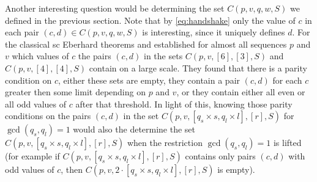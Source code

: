 Another interesting question would be determining the set $C(p, v, q, w, S)$ we defined in the previous section. Note that by \eqref{eq:handshake} only the value of $c$ in each pair $(c, d) \in C(p, v, q, w, S)$ is interesting, since it uniquely defines $d$. For the classical {sc Eberhard} theorems \cite{jendrol1993face} and \cite{jucovivc1976face} established for almost all sequences $p$ and $v$ which values of $c$ the pairs $(c, d)$ in the sets $C(p, v, [6], [3], S)$ and $C(p, v, [4], [4], S)$ contain on a large scale. They found that there is a parity condition on $c$, either these sets are empty, they contain a pair $(c, d)$ for each $c$ greater then some limit depending on $p$ and $v$, or they contain either all even or all odd values of $c$ after that threshold. In light of this, knowing those parity conditions on the pairs $(c, d)$ in the set $C(p, v, [q_s \times s, q_l \times l], [r], S)$ for $\gcd(q_s, q_l) = 1$ would also the determine the set $C(p, v, [q_s \times s, q_l \times l], [r], S)$ when the restriction $\gcd(q_s, q_l) = 1$ is lifted (for example if $C(p, v, [q_s \times s, q_l \times l], [r], S)$ contains only pairs $(c, d)$ with odd values of $c$, then $C(p, v, 2 \cdot [q_s \times s, q_l \times l], [r], S)$ is empty).